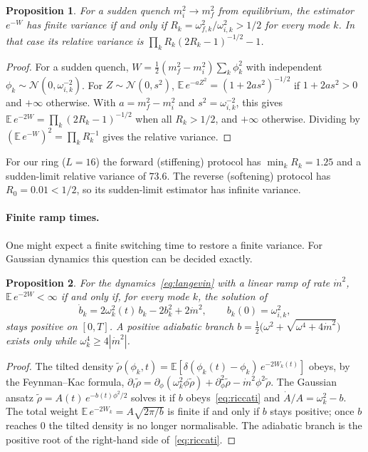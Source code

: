 \documentclass[11pt]{article}
\newtheorem{proposition}{Proposition}[section]
\theoremstyle{remark}\newtheorem*{remark}{Remark}
\begin{document}
\begin{proposition}
\label{prop:variance}
For a sudden quench $m_i^2\to m_f^2$ from equilibrium, the estimator $e^{-W}$ has finite variance if and only if
$R_k=\omega_{f,k}^2/\omega_{i,k}^2>1/2$ for every mode $k$. In that case its relative variance is
$\prod_kR_k(2R_k-1)^{-1/2}-1$.
\end{proposition}

\begin{proof}
For a sudden quench, $W=\tfrac12(m_f^2-m_i^2)\sum_k\phi_k^2$ with independent $\phi_k\sim\mathcal N(0,\omega_{i,k}^{-2})$.
For $Z\sim\mathcal N(0,s^2)$, $\mathbb E\,e^{-aZ^2}=(1+2as^2)^{-1/2}$ if $1+2as^2>0$ and $+\infty$ otherwise. With
$a=m_f^2-m_i^2$ and $s^2=\omega_{i,k}^{-2}$, this gives $\mathbb E\,e^{-2W}=\prod_k(2R_k-1)^{-1/2}$ when all $R_k>1/2$,
and $+\infty$ otherwise. Dividing by $(\mathbb E\,e^{-W})^2=\prod_kR_k^{-1}$ gives the relative variance.
\end{proof}

For our ring ($L=16$) the forward (stiffening) protocol has $\min_kR_k=1.25$ and a sudden-limit relative variance of
$73.6$. The reverse (softening) protocol has $R_0=0.01<1/2$, so its sudden-limit estimator has infinite variance.

\paragraph{Finite ramp times.}
One might expect a finite switching time to restore a finite variance. For Gaussian dynamics this question can be
decided exactly.

\begin{proposition}
\label{prop:riccati}
For the dynamics~\eqref{eq:langevin} with a linear ramp of rate $\dot m^2$, $\mathbb E\,e^{-2W}<\infty$ if and only if,
for every mode $k$, the solution of
\begin{equation}
\dot b_k=2\omega_k^2(t)\,b_k-2b_k^2+2\dot m^2,\qquad b_k(0)=\omega_{i,k}^2,
\label{eq:riccati}
\end{equation}
stays positive on $[0,T]$. A positive adiabatic branch $b=\tfrac12\bigl(\omega^2+\sqrt{\omega^4+4\dot m^2}\bigr)$
exists only while $\omega_k^4\ge4|\dot m^2|$.
\end{proposition}

\begin{proof}
The tilted density $\tilde\rho(\phi_k,t)=\mathbb E[\delta(\phi_k(t)-\phi_k)\,e^{-2W_k(t)}]$ obeys, by the
Feynman--Kac formula, $\partial_t\tilde\rho=\partial_\phi(\omega_k^2\phi\tilde\rho)+\partial_\phi^2\tilde\rho
-\dot m^2\phi^2\tilde\rho$. The Gaussian ansatz $\tilde\rho=A(t)\,e^{-b(t)\phi^2/2}$ solves it if $b$
obeys~\eqref{eq:riccati} and $\dot A/A=\omega_k^2-b$. The total weight $\mathbb E\,e^{-2W_k}=A\sqrt{2\pi/b}$ is finite if
and only if $b$ stays positive; once $b$ reaches $0$ the tilted density is no longer normalisable. The adiabatic
branch is the positive root of the right-hand side of~\eqref{eq:riccati}.
\end{proof}
\end{document}
